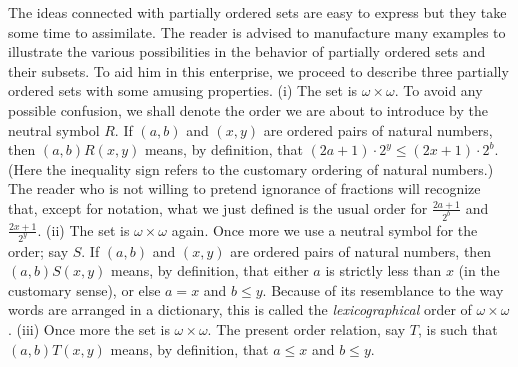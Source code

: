 The ideas connected with partially ordered sets are easy to express but they take some time to assimilate. The reader is advised to manufacture many examples to illustrate the various possibilities in the behavior of partially ordered sets and their subsets. To aid him in this enterprise, we proceed to describe three partially ordered sets with some amusing properties. (i) The set is $\omega \times \omega$. To avoid any possible confusion, we shall denote the order we are about to introduce by the neutral symbol $R$. If $(a,b)$ and $(x, y)$ are ordered pairs of natural numbers, then $(a, b)R(x, y)$ means, by definition, that $(2a + 1) \cdot 2^{y} \le (2x + 1) \cdot 2^{b}$. (Here the inequality sign refers to the customary ordering of natural numbers.) The reader who is not willing to pretend ignorance of fractions will recognize that, except for notation, what we just defined is the usual order for $\frac{2a + 1}{2^{b}}$ and $\frac{2x + 1}{2^{y}}$. (ii) The set is $\omega \times \omega$ again. Once more we use a neutral symbol for the order; say $S$. If $(a,b)$ and $(x,y)$ are ordered pairs of natural numbers, then $(a,b)S(x,y)$ means, by definition, that either $a$ is strictly less than $x$ (in the customary sense), or else $a = x$ and $b \le y$. Because of its resemblance to the way words are arranged in a dictionary, this is called the \textit{lexicographical} order of $\omega \times \omega$. (iii) Once more the set is $\omega \times \omega$. The present order relation, say $T$, is such that $(a,b)T(x,y)$ means, by definition, that $a \le x$ and $b \le y$.